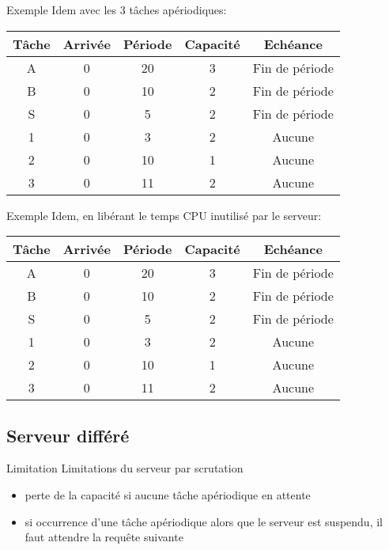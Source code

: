 \begin{frame}{Exemple}
  Idem avec les 3 tâches apériodiques:
  \begin{center}
    \begin{tabular}{ccccc}
      \hline
      Tâche & Arrivée & Période & Capacité & Echéance \\
      \hline
      A & 0 & 20 & 3 & Fin de période\\
      B & 0 & 10 & 2 & Fin de période\\
      S & 0 &  5 & 2 & Fin de période\\
      1 & 0 &  3 & 2 & Aucune\\
      2 & 0 & 10 & 1 & Aucune\\
      3 & 0 & 11 & 2 & Aucune\\
      \hline
    \end{tabular}
  \end{center}
\end{frame} 

\begin{frame}{Exemple}
  Idem, en libérant le temps CPU inutilisé par le serveur:
  \begin{center}
    \begin{tabular}{ccccc}
      \hline
      Tâche & Arrivée & Période & Capacité & Echéance \\
      \hline
      A & 0 & 20 & 3 & Fin de période\\
      B & 0 & 10 & 2 & Fin de période\\
      S & 0 &  5 & 2 & Fin de période\\
      1 & 0 &  3 & 2 & Aucune\\
      2 & 0 & 10 & 1 & Aucune\\
      3 & 0 & 11 & 2 & Aucune\\
      \hline
    \end{tabular}
  \end{center}
\end{frame} 

\subsection{Serveur différé}

\begin{frame}{Limitation} 
  Limitations du serveur par scrutation 
  \begin{itemize}
  \item perte de la capacité si aucune tâche apériodique en attente
  \item si occurrence d'une tâche apériodique alors que le serveur est
    suspendu, il faut attendre la requête suivante
  \end{itemize}
\end{frame} 

